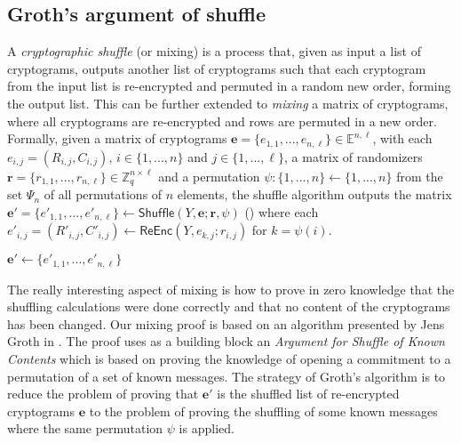 \clearpage
\subsection{Groth's argument of shuffle} \label{app: groth's argument of shuffle}
A \textit{cryptographic shuffle} (or mixing) is a process that, given as input a list of cryptograms, outputs another list of cryptograms such that each cryptogram from the input list is re-encrypted and permuted in a random new order, forming the output list. This can be further extended to \textit{mixing} a matrix of cryptograms, where all cryptograms are re-encrypted and rows are permuted in a new order. Formally, given a matrix of cryptograms $\boldsymbol{e} = \{e_{1,1}, ..., e_{n,\ell}\} \in \mathbb{E}^{n,\ell}$, with each $e_{i,j} = (R_{i,j}, C_{i,j})$, $i \in \{1, ..., n\}$ and $j \in \{1, ..., \ell\}$, a matrix of randomizers $\boldsymbol{r} = \{r_{1,1}, ..., r_{n,\ell}\} \in \mathbb{Z}_q^{n \times \ell}$ and a permutation $\psi:\{1, ..., n\} \gets \{1, ..., n\}$ from the set $\Psi_n$ of all permutations of $n$ elements, the shuffle algorithm outputs the matrix $\boldsymbol{e'} = \{e'_{1,1}, ..., e'_{n,\ell}\} \gets \mathsf{Shuffle} (Y, \boldsymbol{e}; \boldsymbol{r}, \psi)$ () where each $e'_{i,j} = (R'_{i,j}, C'_{i,j}) \gets \mathsf{ReEnc} (Y, e_{k,j}; r_{i,j})$ for $k = \psi(i)$. 

\begin{algorithm}[ht]
    \DontPrintSemicolon
    \caption{$\mathsf{Shuffle}(Y, \boldsymbol{e}, \boldsymbol{r}, \psi)$}
    
    $\boldsymbol{e'} \gets \{e'_{1,1}, ..., e'_{n,\ell}\}$ \;
     
    
    \label{alg: shuffle}
\end{algorithm}

The really interesting aspect of mixing is how to prove in zero knowledge that the shuffling calculations were done correctly and that no content of the cryptograms has been changed. Our mixing proof is based on an algorithm presented by Jens Groth in \cite{Groth05}. The proof uses as a building block an \textit{Argument for Shuffle of Known Contents} which is based on proving the knowledge of opening a commitment to a permutation of a set of known messages. The strategy of Groth's algorithm is to reduce the problem of proving that $\boldsymbol{e'}$ is the shuffled list of re-encrypted cryptograms $\boldsymbol{e}$ to the problem of proving the shuffling of some known messages where the same permutation $\psi$ is applied.

